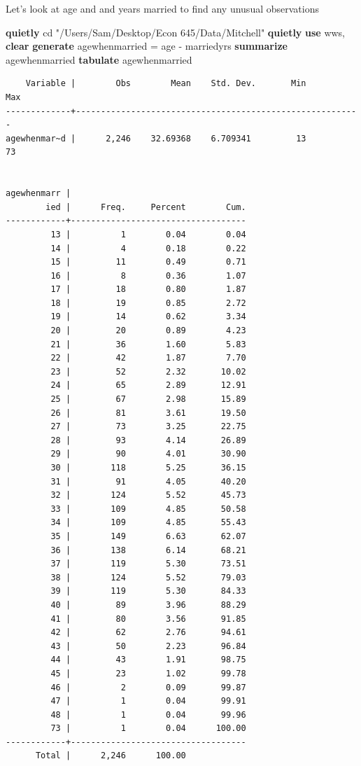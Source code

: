 \documentclass[
]{book}
\newenvironment{Shaded}{\begin{snugshade}}{\end{snugshade}}
\newcommand{\KeywordTok}[1]{\textcolor[rgb]{0.13,0.29,0.53}{\textbf{#1}}}
\newcommand{\NormalTok}[1]{#1}
\newcommand{\StringTok}[1]{\textcolor[rgb]{0.31,0.60,0.02}{#1}}
\begin{document}
Let's look at age and and years married to find any unusual observations

\begin{Shaded}
\begin{Highlighting}[]
\KeywordTok{quietly}\NormalTok{ cd }\StringTok{"/Users/Sam/Desktop/Econ 645/Data/Mitchell"}
\KeywordTok{quietly} \KeywordTok{use}\NormalTok{ wws, }\KeywordTok{clear}
\KeywordTok{generate}\NormalTok{ agewhenmarried = age {-} marriedyrs}
\KeywordTok{summarize}\NormalTok{ agewhenmarried }
\KeywordTok{tabulate}\NormalTok{ agewhenmarried}
\end{Highlighting}
\end{Shaded}

\begin{verbatim}
    Variable |        Obs        Mean    Std. Dev.       Min        Max
-------------+---------------------------------------------------------
agewhenmar~d |      2,246    32.69368    6.709341         13         73


agewhenmarr |
        ied |      Freq.     Percent        Cum.
------------+-----------------------------------
         13 |          1        0.04        0.04
         14 |          4        0.18        0.22
         15 |         11        0.49        0.71
         16 |          8        0.36        1.07
         17 |         18        0.80        1.87
         18 |         19        0.85        2.72
         19 |         14        0.62        3.34
         20 |         20        0.89        4.23
         21 |         36        1.60        5.83
         22 |         42        1.87        7.70
         23 |         52        2.32       10.02
         24 |         65        2.89       12.91
         25 |         67        2.98       15.89
         26 |         81        3.61       19.50
         27 |         73        3.25       22.75
         28 |         93        4.14       26.89
         29 |         90        4.01       30.90
         30 |        118        5.25       36.15
         31 |         91        4.05       40.20
         32 |        124        5.52       45.73
         33 |        109        4.85       50.58
         34 |        109        4.85       55.43
         35 |        149        6.63       62.07
         36 |        138        6.14       68.21
         37 |        119        5.30       73.51
         38 |        124        5.52       79.03
         39 |        119        5.30       84.33
         40 |         89        3.96       88.29
         41 |         80        3.56       91.85
         42 |         62        2.76       94.61
         43 |         50        2.23       96.84
         44 |         43        1.91       98.75
         45 |         23        1.02       99.78
         46 |          2        0.09       99.87
         47 |          1        0.04       99.91
         48 |          1        0.04       99.96
         73 |          1        0.04      100.00
------------+-----------------------------------
      Total |      2,246      100.00
\end{verbatim}
\end{document}
